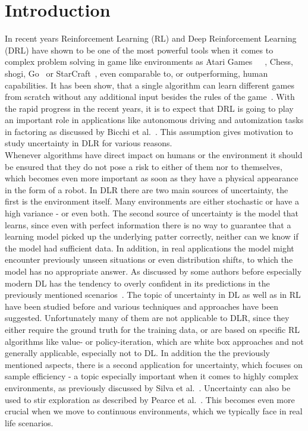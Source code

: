 \documentclass[11pt,a4paper]{article}
\begin{document}
    \section{Introduction}\label{sec:introduction}
    In recent years Reinforcement Learning (RL) and Deep Reinforcement Learning (DRL) have shown to be one of the most powerful tools when it comes to complex problem solving in game like environments as Atari Games~\cite{mnih_asynchronous_2016}~\cite{mnih_human-level_2015}~\cite{van_hasselt_deep_2015}, Chess, shogi, Go~\cite{silver_general_2018} or StarCraft~\cite{vinyals_grandmaster_2019}, even comparable to, or outperforming, human capabilities.
	It has been show, that a single algorithm can learn different games from scratch without any additional input besides the rules of the game~\cite{silver_general_2018}.
	With the rapid progress in the recent years, it is to expect that DRL is going to play an important role in applications like autonomous driving and automization tasks in factoring as discussed by Bicchi et al.~\cite{bicchi_safety_nodate}.
	This assumption gives motivation to study uncertainty in DLR for various reasons.\\
	Whenever algorithms have direct impact on humans or the environment it should be ensured that they do not pose a risk to either of them nor to themselves, which becomes even more important as soon as they have a physical appearance in the form of a robot.
	In DLR there are two main sources of uncertainty, the first is the environment itself.
	Many environments are either stochastic or have a high variance - or even both.
	The second source of uncertainty is the model that learns, since even with perfect information there is no way to guarantee that a learning model picked up the underlying patter correctly, neither can we know if the model had sufficient data.
	In addition, in real applications the model might encounter previously unseen situations or even distribution shifts, to which the model has no appropriate answer.
	As discussed by some authors before especially modern DL has the tendency to overly confident in its predictions in the previously mentioned scenarios~\cite{gal_dropout_2016}.
	The topic of uncertainty in DL as well as in RL have been studied before and various techniques and approaches have been suggested.
	Unfortunately many of them are not applicable to DLR, since they either require the ground truth for the training data, or are based on specific RL algorithms like value- or policy-iteration, which are white box approaches and not generally applicable, especially not to DL.
	In addition the the previously mentioned aspects, there is a second application for uncertainty, which focuses on sample efficiency - a topic especially important when it comes to highly complex environments, as previously discussed by Silva et al.~\cite{da_silva_uncertainty-aware_2020}.
	Uncertainty can also be used to stir exploration as described by Pearce et al.~\cite{pearce_uncertainty_2018}.
	This becomes even more crucial when we move to continuous environments, which we typically face in real life scenarios.\\
\end{document}
